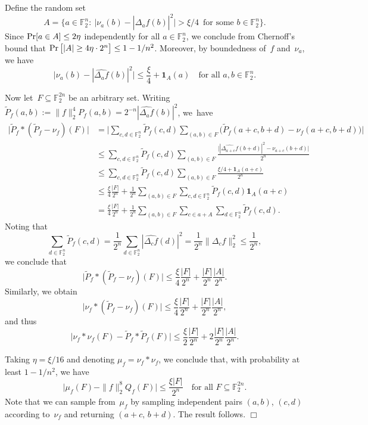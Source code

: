 \documentclass[11pt]{amsart}
\renewcommand{\Pr}{\mathop{\mbox{\rm Pr}}}
\newcommand{\F}{\mathbb{F}} %
\newcommand{\one}{\mathbf{1}}
\theoremstyle{plain}
\theoremstyle{definition}
\theoremstyle{remark}
\renewenvironment{proof}[1][]{
    	\begin{trivlist}
     	\item[\hspace{\labelsep}{\em\noindent Proof#1:\/}]}
     	{{\hfill$\Box$}
    	\end{trivlist}
  }
\begin{document}
\begin{proof}[ of Lemma~\ref{lem:sampling}]
Define the random set
\begin{equation*}
    A = \big\{a\in \F_2^n:\: \big|\nu_a(b) - |\widehat{\Delta_a f}(b)|^2\big| > \xi/4\, \text{ for some $b\in \F_2^n$}\big\}.  
\end{equation*}
Since $\Pr[a\in A] \leq 2\eta$ independently for all $a\in \F_2^n$, we conclude from Chernoff's bound that $\Pr\big[|A| \geq 4\eta \cdot 2^n\big] \leq 1 - 1/n^2$.
Moreover, by boundedness of~$f$ and~$\nu_a$, we have
$$\big|\nu_a(b) - |\widehat{\Delta_a f}(b)|^2\big| \leq \frac{\xi}{4} + \one_A(a) \quad \text{for all $a, b\in \F_2^n$.}$$

Now let~$F\subseteq \F_2^{2n}$ be an arbitrary set.
Writing $\tilde{P}_f(a, b) := \|f\|_2^4 P_f(a, b) = 2^{-n} |\widehat{\Delta_a f}(b)|^2$, we~have
\begin{align*}
    \big|\tilde{P}_f * (\tilde{P}_f - \nu_f) (F)\big|
    &= \bigg| \sum_{c, d\in \F_2^n} \tilde{P}_f(c,d) \sum_{(a,b) \in F} \big(\tilde{P}_f(a+c, b+d) - \nu_f(a+c, b+d)\big) \bigg| \\
    &\leq\sum_{c, d\in \F_2^n} \tilde{P}_f(c,d) \sum_{(a,b) \in F} \frac{\big||\widehat{\Delta_{a+c}f}(b+d)|^2 - \nu_{a+c}(b+d)\big|}{2^n} \\
    &\leq\sum_{c, d\in \F_2^n} \tilde{P}_f(c,d) \sum_{(a,b) \in F} \frac{\xi/4 + \one_A(a+c)}{2^n} \\
    &\leq \frac{\xi}{4} \frac{|F|}{2^n} + \frac{1}{2^n} \sum_{(a,b) \in F} \sum_{c, d\in \F_2^n} \tilde{P}_f(c,d) \one_A(a+c) \\
    &= \frac{\xi}{4} \frac{|F|}{2^n} + \frac{1}{2^n} \sum_{(a,b) \in F} \sum_{c\in a+A} \sum_{d\in \F_2^n} \tilde{P}_f(c,d).
\end{align*}
Noting that
$$\sum_{d\in \F_2^n} \tilde{P}_f(c,d) = \frac{1}{2^n} \sum_{d\in \F_2^n} |\widehat{\Delta_c f}(d)|^2 = \frac{1}{2^n} \|\Delta_c f\|_2^2 \leq \frac{1}{2^n},$$
we conclude that
$$\big|\tilde{P}_f * (\tilde{P}_f - \nu_f) (F)\big| \leq \frac{\xi}{4} \frac{|F|}{2^n} + \frac{|F|}{2^n} \frac{|A|}{2^n}.$$
Similarly, we obtain
$$\big|\nu_f * (\tilde{P}_f - \nu_f)(F)\big| \leq \frac{\xi}{4} \frac{|F|}{2^n} + \frac{|F|}{2^n} \frac{|A|}{2^n},$$
and thus
$$\big|\nu_f * \nu_f(F) - \tilde{P}_f * \tilde{P}_f(F)\big| \leq \frac{\xi}{2} \frac{|F|}{2^n} + 2\frac{|F|}{2^n} \frac{|A|}{2^n}.$$

Taking $\eta = \xi/16$ and denoting $\mu_f = \nu_f * \nu_f$, we conclude that, with probability at least $1-1/n^2$, we have
\begin{equation}
    \big|\mu_f(F) - \|f\|_2^8 Q_f(F)\big| \leq \frac{\xi |F|}{2^n} \quad \text{for all $F\subseteq \F_2^{2n}$.}
\end{equation}
Note that we can sample from~$\mu_f$ by sampling independent pairs $(a,b)$, $(c,d)$ according to~$\nu_f$ and returning $(a+c,\, b+d)$.
The result follows.
\end{proof}
\end{document}
